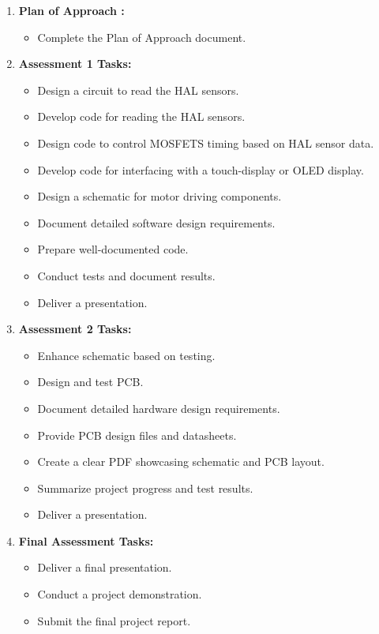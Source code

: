 \begin{enumerate}
    \item \textbf{Plan of Approach :}
    \begin{itemize}
        \item Complete the Plan of Approach document.
    \end{itemize}

    \item \textbf{Assessment 1 Tasks:}
    \begin{itemize}
        \item Design a circuit to read the HAL sensors.
        \item Develop code for reading the HAL sensors.
        \item Design code to control MOSFETS timing based on HAL sensor data.
        \item Develop code for interfacing with a touch-display or OLED display.
        \item Design a schematic for motor driving components.
        \item Document detailed software design requirements.
        \item Prepare well-documented code.
        \item Conduct tests and document results.
        \item Deliver a presentation.
    \end{itemize}

    \item \textbf{Assessment 2 Tasks:}
    \begin{itemize}
        \item Enhance schematic based on testing.
        \item Design and test PCB.
        \item Document detailed hardware design requirements.
        \item Provide PCB design files and datasheets.
        \item Create a clear PDF showcasing schematic and PCB layout.
        \item Summarize project progress and test results.
        \item Deliver a presentation.
    \end{itemize}

    \item \textbf{Final Assessment Tasks:}
    \begin{itemize}
        \item Deliver a final presentation.
        \item Conduct a project demonstration.
        \item Submit the final project report.
    \end{itemize}
\end{enumerate}

